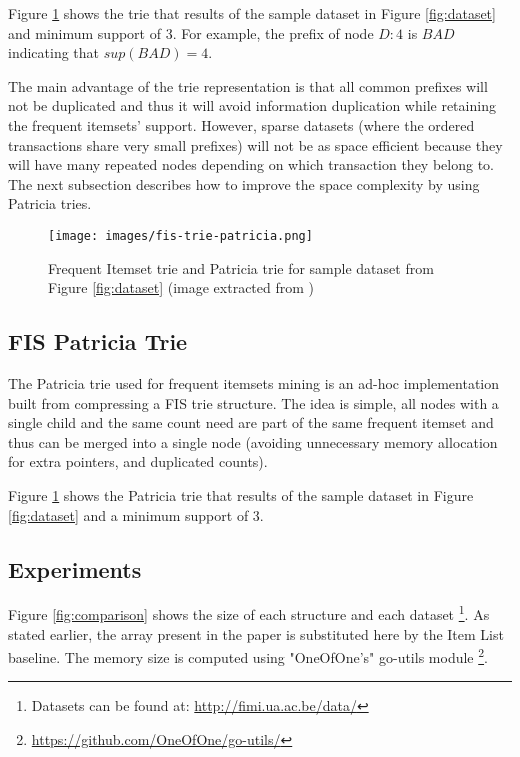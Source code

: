 \documentclass[a4paper,10pt,table,xcdraw]{article}
\begin{document}
Figure \ref{fig:fis-trie} shows the trie that results of the sample dataset in Figure \ref{fig:dataset} and minimum support of 3. For example, the prefix of node $D:4$ is $BAD$ indicating that $sup(BAD) = 4$.

The main advantage of the trie representation is that all common prefixes will not be duplicated and thus it will avoid information duplication while retaining the frequent itemsets' support. However, sparse datasets (where the ordered transactions share very small prefixes) will not be as space efficient because they will have many repeated nodes depending on which transaction they belong to. The next subsection describes how to improve the space complexity by using Patricia tries.


\begin{figure}[H]
\centering
\texttt{[image: images/fis-trie-patricia.png]}
\caption{Frequent Itemset trie and Patricia trie for sample dataset from Figure \ref{fig:dataset} (image extracted from \cite{Pietracaprina2003}) }
\label{fig:fis-trie}
\end{figure}

\subsection{FIS Patricia Trie}

The Patricia trie used for frequent itemsets mining is an ad-hoc implementation built from compressing a FIS trie structure. The idea is simple, all nodes with a single child and the same count need are part of the same frequent itemset and thus can be merged into a single node (avoiding unnecessary memory allocation for extra pointers, and duplicated counts).

Figure \ref{fig:fis-trie} shows the Patricia trie that results of the sample dataset in Figure \ref{fig:dataset} and a minimum support of 3.


\subsection{Experiments}
\label{subsec:fis-comparison}

Figure \ref{fig:comparison} shows the size of each structure and each dataset \footnote{ Datasets can be found at: \url{http://fimi.ua.ac.be/data/}}. As stated earlier, the array present in the paper is substituted here by the Item List baseline. The memory size is computed using "OneOfOne's" go-utils module \footnote{ \url{https://github.com/OneOfOne/go-utils/}}. 
\end{document}
